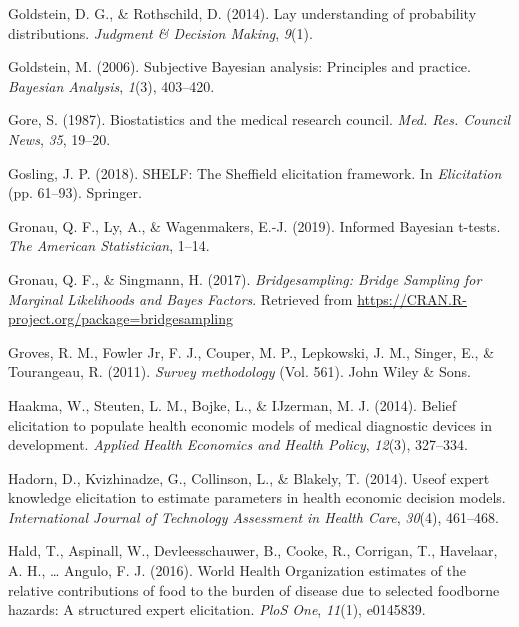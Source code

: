 \documentclass[openright,titlepage,12pt,a4paper]{book}
\begin{document}
\leavevmode\hypertarget{ref-goldstein_lay_2014}{}%
Goldstein, D. G., \& Rothschild, D. (2014). Lay understanding of probability distributions. \emph{Judgment \& Decision Making}, \emph{9}(1).

\leavevmode\hypertarget{ref-goldstein_subjective_2006}{}%
Goldstein, M. (2006). Subjective Bayesian analysis: Principles and practice. \emph{Bayesian Analysis}, \emph{1}(3), 403--420.

\leavevmode\hypertarget{ref-gore_biostatistics_1987}{}%
Gore, S. (1987). Biostatistics and the medical research council. \emph{Med. Res. Council News}, \emph{35}, 19--20.

\leavevmode\hypertarget{ref-gosling_shelf:_2018}{}%
Gosling, J. P. (2018). SHELF: The Sheffield elicitation framework. In \emph{Elicitation} (pp. 61--93). Springer.

\leavevmode\hypertarget{ref-gronau_informed_2019}{}%
Gronau, Q. F., Ly, A., \& Wagenmakers, E.-J. (2019). Informed Bayesian t-tests. \emph{The American Statistician}, 1--14.

\leavevmode\hypertarget{ref-gronau_bridgesampling:_2017}{}%
Gronau, Q. F., \& Singmann, H. (2017). \emph{Bridgesampling: Bridge Sampling for Marginal Likelihoods and Bayes Factors}. Retrieved from \url{https://CRAN.R-project.org/package=bridgesampling}

\leavevmode\hypertarget{ref-groves_survey_2011}{}%
Groves, R. M., Fowler Jr, F. J., Couper, M. P., Lepkowski, J. M., Singer, E., \& Tourangeau, R. (2011). \emph{Survey methodology} (Vol. 561). John Wiley \& Sons.

\leavevmode\hypertarget{ref-haakma_belief_2014}{}%
Haakma, W., Steuten, L. M., Bojke, L., \& IJzerman, M. J. (2014). Belief elicitation to populate health economic models of medical diagnostic devices in development. \emph{Applied Health Economics and Health Policy}, \emph{12}(3), 327--334.

\leavevmode\hypertarget{ref-hadorn_useof_2014}{}%
Hadorn, D., Kvizhinadze, G., Collinson, L., \& Blakely, T. (2014). Useof expert knowledge elicitation to estimate parameters in health economic decision models. \emph{International Journal of Technology Assessment in Health Care}, \emph{30}(4), 461--468.

\leavevmode\hypertarget{ref-hald_world_2016}{}%
Hald, T., Aspinall, W., Devleesschauwer, B., Cooke, R., Corrigan, T., Havelaar, A. H., \ldots{} Angulo, F. J. (2016). World Health Organization estimates of the relative contributions of food to the burden of disease due to selected foodborne hazards: A structured expert elicitation. \emph{PloS One}, \emph{11}(1), e0145839.
\end{document}
